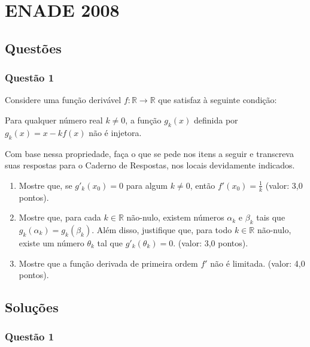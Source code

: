\chapter{ENADE 2008}

\section{\color{blue} Quest\~oes}

\subsection{\color{blue} Quest\~ao 1}

Considere uma fun\c c\~ao deriv\'avel $f: \mathbb{R} \to \mathbb{R}$ que satisfaz \`a seguinte condi\c c\~ao:

Para qualquer n\'umero real $k\neq 0$, a fun\c c\~ao $g_k (x)$ definida por $g_k (x)=x-kf(x)$ n\~ao \'e injetora.

Com base nessa propriedade, fa\c ca o que se pede nos itens a seguir e transcreva suas respostas para o Caderno de Respostas, nos locais devidamente indicados.

\begin{enumerate}

\item[(a)] Mostre que, se $g'_k(x_0)=0$ para algum $k\neq 0$, ent\~ao $f' (x_0)=\frac1{k}$ (valor: 3,0 pontos).

\item[(b)] Mostre que, para cada $k \in \mathbb{R}$ n\~ao-nulo, existem n\'umeros $\alpha_k$ e $\beta_k$ tais que $g_k(\alpha_k) = g_k(\beta_k)$. Al\'em disso, justifique que, para todo $k \in \mathbb{R}$ n\~ao-nulo, existe um n\'umero $\theta_k$ tal que $g'_k(\theta_k)=0$. (valor: 3,0 pontos).

\item[(c)] Mostre que a fun\c c\~ao derivada de primeira ordem $f'$ n\~ao \'e limitada. (valor: 4,0 pontos).

\end{enumerate}

\section{\color{red} Solu\c c\~oes}

\subsection{\color{red} Quest\~ao 1}

